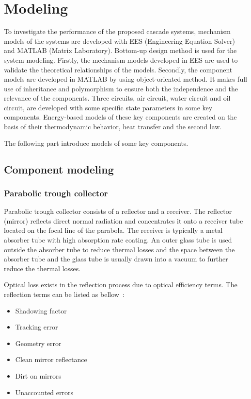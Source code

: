 \chapter{Modeling}
\label{cha:Modeling}

To investigate the performance of the proposed cascade systems, mechanism models of the systems are developed with EES (Engineering Equation Solver) and MATLAB (Matrix Laboratory). Bottom-up design method is used for the system modeling. Firstly, the mechanism models developed in EES are used to validate the theoretical relationships of the models. Secondly, the component models are developed in MATLAB by using object-oriented method. It makes full use of inheritance and polymorphism to ensure both the independence and the relevance of the components.
Three circuits, air circuit, water circuit and oil circuit, are developed with some specific state parameters in some key components. Energy-based models of these key components are created on the basis of their thermodynamic behavior, heat transfer and the second law.

The following part introduce models of some key components.
\section{Component modeling}
\subsection{Parabolic trough collector}
\label{sec:ptc}

Parabolic trough collector consists of a reflector and a receiver. The reflector (mirror) reflects direct normal radiation and concentrates it onto a receiver tube located on the focal line of the parabola. The receiver is typically a metal absorber tube with high absorption rate coating. An outer glass tube is used outside the absorber tube to reduce thermal losses and the space between the absorber tube and the glass tube is usually drawn into a vacuum to further reduce the thermal losses.

Optical loss exists in the reflection process due to optical efficiency terms. The reflection terms can be listed as bellow~\cite{Price2002}:

\begin{itemize}
  \item Shadowing factor
  \item Tracking error
  \item Geometry error
  \item Clean mirror reflectance
  \item Dirt on mirrors
  \item Unaccounted errors
\end{itemize}

